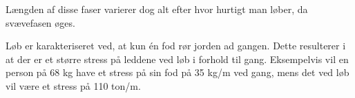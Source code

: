 Længden af disse faser varierer dog alt efter hvor hurtigt man løber, da svævefasen øges. 

Løb er karakteriseret ved, at kun én fod rør jorden ad gangen. Dette resulterer i at der er et større stress på leddene ved løb i forhold til gang. Eksempelvis vil en person på 68 kg have et stress på sin fod på 35 kg/m ved gang, mens det ved løb vil være et stress på 110 ton/m. 

 














